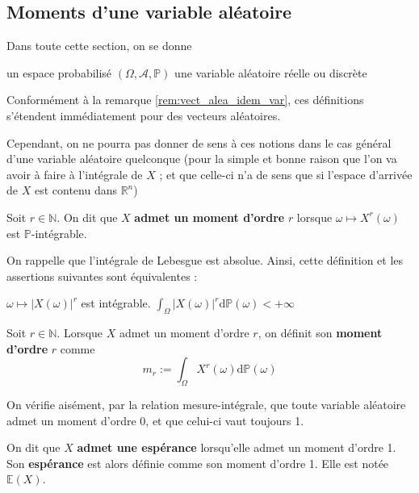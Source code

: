 \documentclass[../integ-proba.tex]{subfiles}
\begin{document}
\subsection{Moments d'une variable aléatoire}

Dans toute cette section, on se donne
\begin{itemize}
    \itemb un espace probabilisé $\left(\Omega, \mathcal{A}, \mathbb{P}\right)$
    \itemb une variable aléatoire réelle ou discrète
\end{itemize}

Conformément à la remarque \ref{rem:vect_alea_idem_var}, ces définitions s'étendent immédiatement pour des vecteurs aléatoires.

Cependant, on ne pourra pas donner de sens à ces notions dans le cas général d'une variable aléatoire quelconque (pour la simple et bonne raison que l'on va avoir à faire à l'intégrale de $X$ ; et que celle-ci n'a de sens que si l'espace d'arrivée de $X$ est contenu dans $\mathbb{R}^n$)

\begin{defi}
    Soit $r\in\mathbb{N}$. On dit que $X$ \textbf{admet un moment d'ordre} $r$ lorsque $\omega \mapsto X^r(\omega)$ est $\mathbb{P}$-intégrable.
\end{defi}

\begin{rem}
    On rappelle que l'intégrale de Lebesgue est absolue. Ainsi, cette définition et les assertions suivantes sont équivalentes :
    \begin{itemize}
        \itemb $\omega \mapsto \left|X(\omega)\right|^r$ est intégrable.
        \itemb $\displaystyle \int_\Omega\left|X(\omega)\right|^r\text{d}\mathbb{P}(\omega) < +\infty$
    \end{itemize}
\end{rem}

\begin{defi}
    Soit $r\in\mathbb{N}$. Lorsque $X$ admet un moment d'ordre $r$, on définit son \textbf{moment d'ordre } $r$ comme
    $$m_r := \int_\Omega X^r(\omega)\text{d}\mathbb{P}(\omega)$$
\end{defi}

\begin{rem}
    On vérifie aisément, par la relation mesure-intégrale, que toute variable aléatoire admet un moment d'ordre 0, et que celui-ci vaut toujours 1.
\end{rem}

\begin{defi}
    On dit que $X$ \textbf{admet une espérance} lorsqu'elle admet un moment d'ordre 1.
    Son \textbf{espérance} est alors définie comme son moment d'ordre 1.
    Elle est notée $\mathbb{E}(X)$.
\end{defi}
\end{document}
